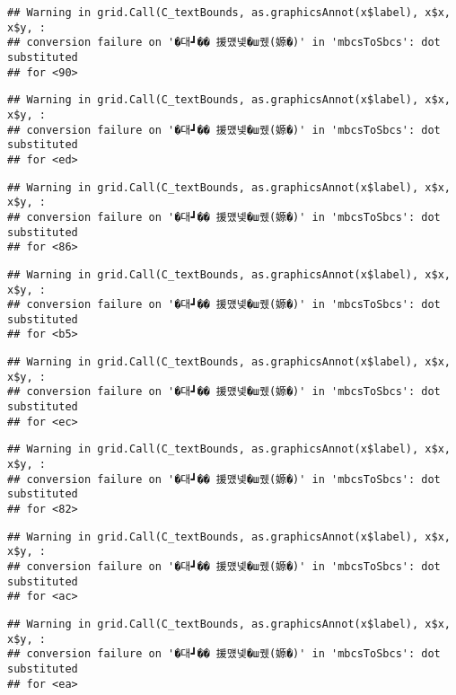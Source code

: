 \documentclass[
]{article}
\begin{document}
\begin{verbatim}
## Warning in grid.Call(C_textBounds, as.graphicsAnnot(x$label), x$x, x$y, :
## conversion failure on '�대┛�� 援먰넻�ш퀬(嫄�)' in 'mbcsToSbcs': dot substituted
## for <90>
\end{verbatim}

\begin{verbatim}
## Warning in grid.Call(C_textBounds, as.graphicsAnnot(x$label), x$x, x$y, :
## conversion failure on '�대┛�� 援먰넻�ш퀬(嫄�)' in 'mbcsToSbcs': dot substituted
## for <ed>
\end{verbatim}

\begin{verbatim}
## Warning in grid.Call(C_textBounds, as.graphicsAnnot(x$label), x$x, x$y, :
## conversion failure on '�대┛�� 援먰넻�ш퀬(嫄�)' in 'mbcsToSbcs': dot substituted
## for <86>
\end{verbatim}

\begin{verbatim}
## Warning in grid.Call(C_textBounds, as.graphicsAnnot(x$label), x$x, x$y, :
## conversion failure on '�대┛�� 援먰넻�ш퀬(嫄�)' in 'mbcsToSbcs': dot substituted
## for <b5>
\end{verbatim}

\begin{verbatim}
## Warning in grid.Call(C_textBounds, as.graphicsAnnot(x$label), x$x, x$y, :
## conversion failure on '�대┛�� 援먰넻�ш퀬(嫄�)' in 'mbcsToSbcs': dot substituted
## for <ec>
\end{verbatim}

\begin{verbatim}
## Warning in grid.Call(C_textBounds, as.graphicsAnnot(x$label), x$x, x$y, :
## conversion failure on '�대┛�� 援먰넻�ш퀬(嫄�)' in 'mbcsToSbcs': dot substituted
## for <82>
\end{verbatim}

\begin{verbatim}
## Warning in grid.Call(C_textBounds, as.graphicsAnnot(x$label), x$x, x$y, :
## conversion failure on '�대┛�� 援먰넻�ш퀬(嫄�)' in 'mbcsToSbcs': dot substituted
## for <ac>
\end{verbatim}

\begin{verbatim}
## Warning in grid.Call(C_textBounds, as.graphicsAnnot(x$label), x$x, x$y, :
## conversion failure on '�대┛�� 援먰넻�ш퀬(嫄�)' in 'mbcsToSbcs': dot substituted
## for <ea>
\end{verbatim}
\end{document}
